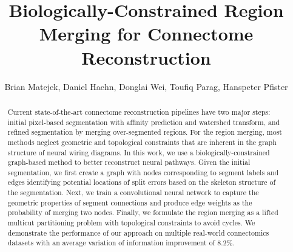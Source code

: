 \documentclass[runningheads]{llncs}
\begin{document}
\pagestyle{headings}
\mainmatter


\title{Biologically-Constrained Region Merging for Connectome Reconstruction}

\author{Brian Matejek, Daniel Haehn, Donglai Wei, Toufiq Parag, Hanspeter Pfister}

\newcommand\TODO[1]{\textcolor{red}{#1}}

\maketitle

\begin{abstract}
Current state-of-the-art connectome reconstruction pipelines have two major steps: initial pixel-based segmentation with affinity prediction and watershed transform, and refined segmentation by merging over-segmented regions.
For the region merging, most methods neglect geometric and topological constraints that are inherent in the graph structure of neural wiring diagrams.
In this work, we use a biologically-constrained graph-based method to better reconstruct neural pathways.
Given the initial segmentation, we first create a graph with nodes corresponding to segment labels and edges identifying potential locations of split errors based on the skeleton structure of the segmentation.
Next, we train a convolutional neural network to capture the geometric properties of segment connections and produce edge weights as the probability of merging two nodes.
Finally, we formulate the region merging as a lifted multicut partitioning problem with topological constraints to avoid cycles.
We demonstrate the performance of our approach on multiple real-world connectomics datasets with an average variation of information improvement of 8.2\%.
\end{abstract}
\end{document}
